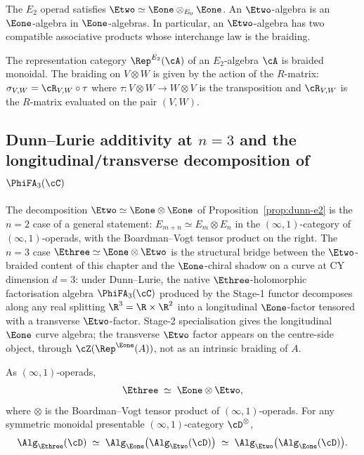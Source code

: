 \begin{proposition}
\label{prop:dunn-e2}
The $E_2$ operad satisfies $\Etwo \simeq \Eone \otimes_{E_0} \Eone$.
An $\Etwo$-algebra is an $\Eone$-algebra in $\Eone$-algebras. In
particular, an $\Etwo$-algebra has two compatible associative products
whose interchange law is the braiding.
\end{proposition}

\begin{corollary}
\label{cor:e2-braided-monoidal}
The representation category $\Rep^{E_2}(\cA)$ of an $E_2$-algebra
$\cA$ is braided monoidal. The braiding on $V \otimes W$ is given by
the action of the $R$-matrix: $\sigma_{V,W} = \cR_{V,W} \circ \tau$
where $\tau \colon V \otimes W \to W \otimes V$ is the transposition
and $\cR_{V,W}$ is the $R$-matrix evaluated on the pair $(V,W)$.
\end{corollary}

\subsection{Dunn--Lurie additivity at \texorpdfstring{$n=3$}{n=3} and the longitudinal/transverse decomposition of \texorpdfstring{$\PhiFA_3(\cC)$}{PhiFA-3(C)}}
\label{subsec:dunn-lurie-additivity-n3}

The decomposition $\Etwo \simeq \Eone \otimes \Eone$ of Proposition~\ref{prop:dunn-e2} is the $n = 2$ case of a general statement: $E_{m+n} \simeq E_m \otimes E_n$ in the $(\infty,1)$-category of $(\infty,1)$-operads, with the Boardman--Vogt tensor product on the right. The $n = 3$ case $\Ethree \simeq \Eone \otimes \Etwo$ is the structural bridge between the $\Etwo$-braided content of this chapter and the $\Eone$-chiral shadow on a curve at CY dimension $d = 3$: under Dunn--Lurie, the native $\Ethree$-holomorphic factorisation algebra $\PhiFA_3(\cC)$ produced by the Stage-1 functor decomposes along any real splitting $\R^3 = \R \times \R^2$ into a longitudinal $\Eone$-factor tensored with a transverse $\Etwo$-factor. Stage-2 specialisation gives the longitudinal $\Eone$ curve algebra; the transverse $\Etwo$ factor appears on the centre-side object, through $\cZ(\Rep^{\Eone}(A))$, not as an intrinsic braiding of $A$.

\begin{theorem}[Dunn--Lurie additivity at \texorpdfstring{$n = 3$}{n = 3}]
\label{thm:dunn-lurie-n3}
As $(\infty,1)$-operads,
\[
 \Ethree \;\simeq\; \Eone \otimes \Etwo,
\]
where $\otimes$ is the Boardman--Vogt tensor product of $(\infty,1)$-operads. For any symmetric monoidal presentable $(\infty,1)$-category $\cD^\otimes$,
\[
 \Alg_{\Ethree}(\cD) \;\simeq\; \Alg_{\Eone}\bigl(\Alg_{\Etwo}(\cD)\bigr)
 \;\simeq\; \Alg_{\Etwo}\bigl(\Alg_{\Eone}(\cD)\bigr).
\]
\end{theorem}

